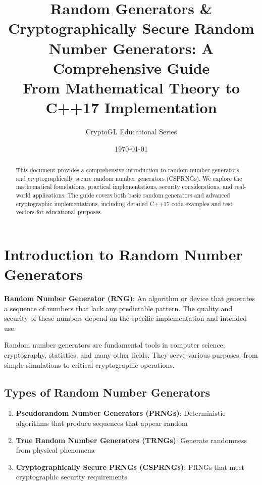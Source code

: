 \documentclass[11pt,a4paper]{article}
\title{\Huge\textbf{Random Generators \& Cryptographically Secure Random Number Generators: A Comprehensive Guide}\\[0.5cm]
\large From Mathematical Theory to C++17 Implementation}
\author{CryptoGL Educational Series}
\date{\today}
\begin{document}
\maketitle

\begin{abstract}
This document provides a comprehensive introduction to random number generators and cryptographically secure random number generators (CSPRNGs). We explore the mathematical foundations, practical implementations, security considerations, and real-world applications. The guide covers both basic random generators and advanced cryptographic implementations, including detailed C++17 code examples and test vectors for educational purposes.
\end{abstract}

\tableofcontents
\newpage

\section{Introduction to Random Number Generators}

\begin{definitionbox}
\textbf{Random Number Generator (RNG)}: An algorithm or device that generates a sequence of numbers that lack any predictable pattern. The quality and security of these numbers depend on the specific implementation and intended use.
\end{definitionbox}

Random number generators are fundamental tools in computer science, cryptography, statistics, and many other fields. They serve various purposes, from simple simulations to critical cryptographic operations.

\subsection{Types of Random Number Generators}

\begin{enumerate}
    \item \textbf{Pseudorandom Number Generators (PRNGs)}: Deterministic algorithms that produce sequences that appear random
    \item \textbf{True Random Number Generators (TRNGs)}: Generate randomness from physical phenomena
    \item \textbf{Cryptographically Secure PRNGs (CSPRNGs)}: PRNGs that meet cryptographic security requirements
\end{enumerate}
\end{document}
